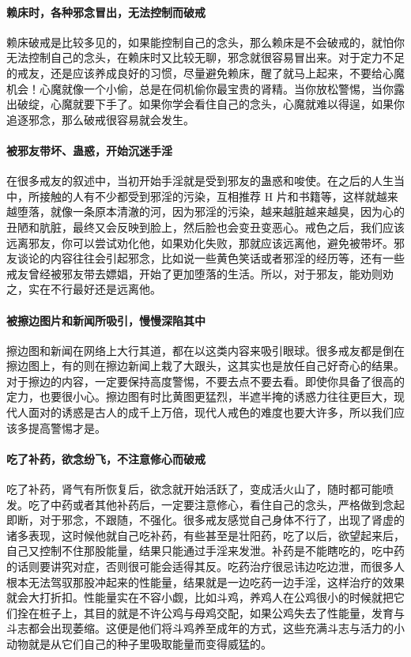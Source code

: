 \paragraph{赖床时，各种邪念冒出，无法控制而破戒} 赖床破戒是比较多见的，如果能控制自己的念头，那么赖床是不会破戒的，就怕你无法控制自己的念头，在赖床时又比较无聊，邪念就很容易冒出来。对于定力不足的戒友，还是应该养成良好的习惯，尽量避免赖床，醒了就马上起来，不要给心魔机会！心魔就像一个小偷，总是在伺机偷你最宝贵的肾精。当你放松警惕，当你露出破绽，心魔就要下手了。如果你学会看住自己的念头，心魔就难以得逞，如果你追逐邪念，那么破戒很容易就会发生。

\paragraph{被邪友带坏、蛊惑，开始沉迷手淫} 在很多戒友的叙述中，当初开始手淫就是受到邪友的蛊惑和唆使。在之后的人生当中，所接触的人有不少都受到邪淫的污染，互相推荐 H 片和书籍等，这样就越来越堕落，就像一条原本清澈的河，因为邪淫的污染，越来越脏越来越臭，因为心的丑陋和肮脏，最终又会反映到脸上，然后脸也会变丑变恶心。戒色之后，我们应该远离邪友，你可以尝试劝化他，如果劝化失败，那就应该远离他，避免被带坏。邪友谈论的内容往往会引起邪念，比如说一些黄色笑话或者邪淫的经历等，还有一些戒友曾经被邪友带去嫖娼，开始了更加堕落的生活。所以，对于邪友，能劝则劝之，实在不行最好还是远离他。

\paragraph{被擦边图片和新闻所吸引，慢慢深陷其中} 擦边图和新闻在网络上大行其道，都在以这类内容来吸引眼球。很多戒友都是倒在擦边图上，有的则在擦边新闻上栽了大跟头，这其实也是放任自己好奇心的结果。对于擦边的内容，一定要保持高度警惕，不要去点不要去看。即使你具备了很高的定力，也要很小心。擦边图有时比黄图更猛烈，半遮半掩的诱惑力往往更巨大，现代人面对的诱惑是古人的成千上万倍，现代人戒色的难度也要大许多，所以我们应该多提高警惕才是。

\paragraph{吃了补药，欲念纷飞，不注意修心而破戒} 吃了补药，肾气有所恢复后，欲念就开始活跃了，变成活火山了，随时都可能喷发。吃了中药或者其他补药后，一定要注意修心，看住自己的念头，严格做到念起即断，对于邪念，不跟随，不强化。很多戒友感觉自己身体不行了，出现了肾虚的诸多表现，这时候他就自己吃补药，有些甚至是壮阳药，吃了以后，欲望起来后，自己又控制不住那股能量，结果只能通过手淫来发泄。补药是不能瞎吃的，吃中药的话则要讲究对症，否则很可能会适得其反。吃药治疗很忌讳边吃边泄，而很多人根本无法驾驭那股冲起来的性能量，结果就是一边吃药一边手淫，这样治疗的效果就会大打折扣。性能量实在不容小觑，比如斗鸡，养鸡人在公鸡很小的时候就把它们拴在桩子上，其目的就是不许公鸡与母鸡交配，如果公鸡失去了性能量，发育与斗志都会出现萎缩。这便是他们将斗鸡养至成年的方式，这些充满斗志与活力的小动物就是从它们自己的种子里吸取能量而变得威猛的。

